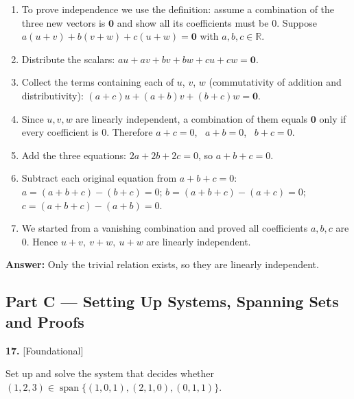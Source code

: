 \documentclass[11pt]{article}
\begin{document}
\begin{tcolorbox}[breakable,colback=ans,colframe=ansb,boxrule=0.5pt,left=4pt,right=4pt,top=2pt,bottom=2pt]\begin{enumerate}[leftmargin=2.2em,itemsep=1pt,topsep=1pt,label=\textbf{Step \arabic*.}]\item To prove independence we use the definition: assume a combination of the three new vectors is $\mathbf 0$ and show all its coefficients must be $0$. Suppose $a(u+v)+b(v+w)+c(u+w)=\mathbf 0$ with $a,b,c\in\mathbb{R}$.
\item Distribute the scalars: $au+av+bv+bw+cu+cw=\mathbf 0$.
\item Collect the terms containing each of $u$, $v$, $w$ (commutativity of addition and distributivity): $(a+c)u+(a+b)v+(b+c)w=\mathbf 0$.
\item Since $u,v,w$ are linearly independent, a combination of them equals $\mathbf 0$ only if every coefficient is $0$. Therefore $a+c=0$, \ $a+b=0$, \ $b+c=0$.
\item Add the three equations: $2a+2b+2c=0$, so $a+b+c=0$.
\item Subtract each original equation from $a+b+c=0$: $a=(a+b+c)-(b+c)=0$; $b=(a+b+c)-(a+c)=0$; $c=(a+b+c)-(a+b)=0$.
\item We started from a vanishing combination and proved all coefficients $a,b,c$ are $0$. Hence $u+v,\ v+w,\ u+w$ are linearly independent.
\end{enumerate}\textbf{Answer:} Only the trivial relation exists, so they are linearly independent.\end{tcolorbox}
\par\vspace{2pt}
\subsection*{\normalsize\color{ink} Part C --- Setting Up Systems, Spanning Sets and Proofs}
\begin{minipage}{\linewidth}\textbf{17.} \hfill{\scriptsize\color{ink}[Foundational]}\par\nopagebreak Set up and solve the system that decides whether $(1,2,3)\in\operatorname{span}\{(1,0,1),(2,1,0),(0,1,1)\}$.
\end{minipage}\par\nopagebreak
\end{document}
